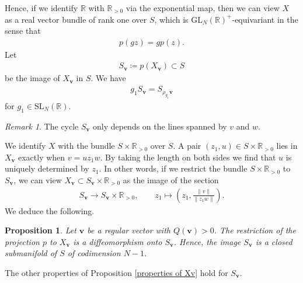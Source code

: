 \documentclass[a4paper,11pt]{amsart} %
\newcommand{\8}{\infty}
\newcommand{\vbf}{\mathbf{v}}
\newcommand{\SL}{\mathrm{SL}}
\newcommand{\GL}{\mathrm{GL}}
\newcommand{\R}{\mathbb{R}}
\theoremstyle{mytheoremstyle}
\newtheorem{prop}[thm]{Proposition}
\theoremstyle{remark}
\newtheorem{rmk}{Remark}[section]
\numberwithin{equation}{section}
\begin{document}
Hence, if we identify $\R$ with $\R_{>0}$ via the exponential map, then we can view $X$ as a real vector bundle of rank one over $S$, which is $\GL_N(\R)^+$-equivariant in the sense that
\begin{align} \label{equivariance1}
    p(gz)=gp(z).
\end{align}
Let
\begin{align}
    S_{\vbf} \coloneqq p(X_{\vbf}) \subset S
\end{align}
be the image of $X_\vbf$ in $S$. We have
\begin{align} \label{equivariance2}
    g_1S_{\vbf}=S_{\rho_{g_1}\vbf}
\end{align}
for $g_1 \in \SL_N(\R)$.
\begin{rmk}
    The cycle $S_\vbf$ only depends on the lines spanned by $v$ and $w$.
\end{rmk}
We identify $X$ with the bundle $S \times \R_{>0}$ over $S$. A pair $(z_1,u) \in S \times \R_{>0}$ lies in $X_\vbf$ exactly when $v=uz_1w$. By taking the length on both sides we find that $u$ is uniquely determined by $z_1$. In other words, if we restrict the bundle $S \times \R_{>0}$ to $S_\vbf$, we can view $X_\vbf \subset S_\vbf \times \R_{>0}$ as the image of the section
\begin{align} \label{sectionofbund}
    S_\vbf \longrightarrow S_\vbf \times \R_{>0}, \qquad z_1 \longmapsto \left (z_1,\frac{\lVert v \rVert}{\lVert z_1w \rVert} \right ).
\end{align}
We deduce the following.
\begin{prop} \label{diffeomorphism}
Let $\vbf$ be a regular vector with $Q(\vbf)>0$. The restriction of the projection $p$ to $X_{\vbf}$ is a diffeomorphism onto $S_\vbf$. Hence, the image $S_{\vbf}$ is a closed submanifold of $S$ of codimension $N-1$.   
\end{prop}
The other properties of Proposition \ref{properties of Xv} hold for $S_\vbf$.
\end{document}
